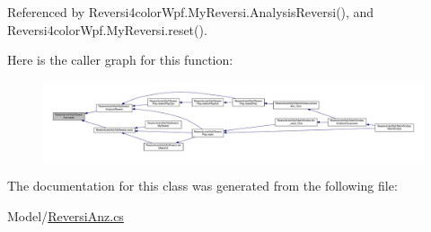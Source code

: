 Referenced by Reversi4color\+Wpf.\+My\+Reversi.\+Analysis\+Reversi(), and Reversi4color\+Wpf.\+My\+Reversi.\+reset().

Here is the caller graph for this function\+:
\nopagebreak
\begin{figure}[H]
\begin{center}
\leavevmode
\includegraphics[width=350pt]{class_reversi4color_wpf_1_1_reversi_anz_a5310f56d39d5910068dd19eff79bec1f_icgraph}
\end{center}
\end{figure}


The documentation for this class was generated from the following file\+:\begin{DoxyCompactItemize}
\item 
Model/\hyperlink{_reversi_anz_8cs}{Reversi\+Anz.\+cs}\end{DoxyCompactItemize}
